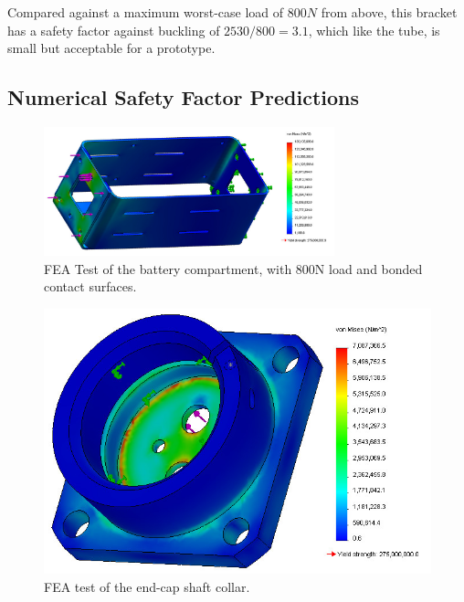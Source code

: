 \documentclass[12pt]{report}
\begin{document}
Compared against a maximum worst-case load of $800N$ from above, this bracket has a safety factor against buckling of $2530/800 = 3.1$, which like the tube, is small but acceptable for a prototype. \\

\newpage
\subsection{Numerical Safety Factor Predictions}


\begin{figure}[thbt]
  \begin{center}
    \includegraphics[width=0.75\textwidth]{./img/battery_compartment_compression_test_edited.jpg}
    \caption{FEA Test of the battery compartment, with 800N load and bonded contact surfaces.~\cite{sabelhaus2014hardware}}
    \label{battery_compartment_FEA}
  \end{center}
\end{figure}

\begin{figure}
   \centering
   \includegraphics[width=0.4\columnwidth]{img/endcap_shaft_collar_compression_test_800N_edited.jpg} 
   \caption{FEA test of the end-cap shaft collar.~\cite{sabelhaus2014hardware}}
   \label{endcap_shaft_collar_FEA}
\end{figure}
\end{document}

